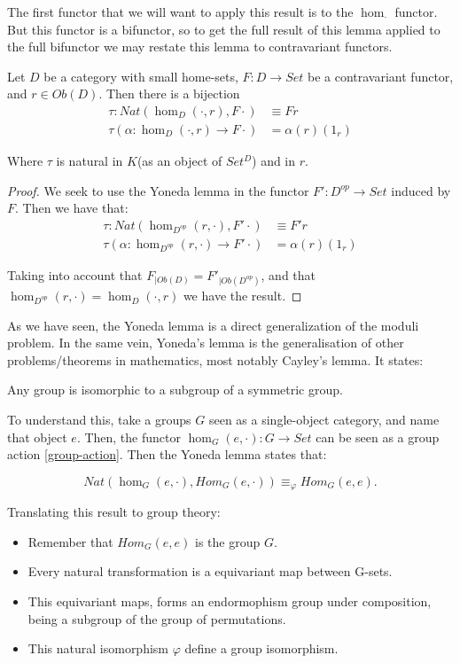 The first functor that we will want to apply this result is to the $\hom_{\cdot}$ functor. But this functor is a bifunctor, so to get the full result of this lemma applied to the full bifunctor we may restate this lemma to contravariant functors.

\begin{corollary}
  Let $D$ be a category with small home-sets, $F:D\to Set$ be a contravariant functor, and $r\in Ob(D)$. Then there is a bijection
  \begin{align*}
    \tau:Nat(\hom_D(\cdot,r), F\cdot) &\equiv Fr\\
    \tau(\alpha:\hom_D(\cdot,r)\to F\cdot)& = \alpha(r)(1_r)
  \end{align*}
  
  Where $\tau$ is natural in $K$(as an object of $Set^{D}$) and in $r$.
\end{corollary}
\begin{proof}
We seek to use the Yoneda lemma in the functor $F':D^{op}\to Set$ induced by $F$. Then we have that: 
  \begin{align*}
    \tau:Nat(\hom_{D^{op}}(r,\cdot), F'\cdot) &\equiv F'r\\
    \tau(\alpha:\hom_{D^{op}}(r,\cdot)\to F'\cdot)& = \alpha(r)(1_r)
  \end{align*}

  Taking into account that $F_{|Ob(D)}=F'_{|Ob(D^{op})}$, and that 
  $\hom_{D^{op}}(r,\cdot) = \hom_D(\cdot,r)$ we have the result.
\end{proof}

As we have seen, the Yoneda lemma is a direct generalization of the moduli problem. In the same vein, Yoneda's lemma is the generalisation of other problems/theorems in mathematics, most notably Cayley's lemma. It states:
\begin{proposition} \label{Cayleys}
Any group is isomorphic to a subgroup of a symmetric group.
\end{proposition}

To understand this, take a groups $G$ seen as a single-object category, and name that object $e$. Then, the functor $\hom_G(e, \cdot): G \to Set$ can be seen as a group action \ref{group-action}. Then the Yoneda lemma states that:

$$Nat(\hom_G(e,\cdot), Hom_G(e,\cdot)) \equiv_\varphi Hom_G(e,e).$$

Translating this result to group theory:
\begin{itemize}
\item Remember that $Hom_G(e,e)$ is the group $G$.
\item Every natural transformation is a equivariant map between G-sets.
\item This equivariant maps, forms an endormophism group under composition, being a subgroup of the group of permutations.
\item This natural isomorphism $\varphi$ define a group isomorphism.
\end{itemize}

